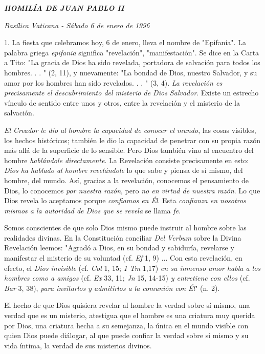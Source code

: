 \begin{body}
\emph{\textbf{HOMILÍA DE JUAN PABLO II}}

\emph{Basílica Vaticana - Sábado 6 de enero de 1996}

1. La fiesta que celebramos hoy, 6 de enero, lleva el nombre de "Epifanía". La palabra griega \emph{epifania} significa "revelación", "manifestación". Se dice en la Carta a Tito: "La gracia de Dios ha sido revelada, portadora de salvación para todos los hombres. . . " (2, 11), y nuevamente: "La bondad de Dios, nuestro Salvador, y su amor por los hombres han sido revelados. . . " (3, 4). \emph{La revelación es precisamente el descubrimiento del misterio de Dios Salvador}. Existe un estrecho vínculo de sentido entre unos y otros, entre la revelación y el misterio de la salvación.

\emph{El Creador le dio al hombre la capacidad de conocer el mundo}, las cosas visibles, los hechos históricos; también le dio la capacidad de penetrar con su propia razón más allá de la superficie de lo sensible. Pero Dios también vino al encuentro del hombre \emph{hablándole directamente}. La Revelación consiste precisamente en esto: \emph{Dios ha hablado al hombre revelándole} lo que sabe y piensa de sí mismo, del hombre, del mundo. Así, gracias a la revelación, conocemos el pensamiento de Dios, lo conocemos \emph{por nuestra razón}, pero \emph{no en virtud de nuestra razón}. Lo que Dios revela lo aceptamos porque \emph{confiamos en Él}. Esta \emph{confianza en nosotros mismos a la autoridad de Dios que se revela} se llama \emph{fe}.

Somos conscientes de que solo Dios mismo puede instruir al hombre sobre las realidades divinas. En la Constitución conciliar \emph{Del Verbum} sobre la Divina Revelación leemos: "Agradó a Dios, en su bondad y sabiduría, revelarse y manifestar el misterio de su voluntad (cf. \emph{Ef} 1, 9) ... Con esta revelación, en efecto, el \emph{Dios invisible} (cf. \emph{Col} 1, 15; \emph{1 Tm} 1,17) \emph{en su inmenso amor habla a los hombres como a amigos} (cf. \emph{Ex} 33, 11; \emph{Jn} 15, 14-15) \emph{y entretiene con ellos} (cf. \emph{Bar} 3, 38), \emph{para invitarlos y admitirlos a la comunión con Él}" (n. 2).

El hecho de que Dios quisiera revelar al hombre la verdad sobre sí mismo, una verdad que es un misterio, atestigua que el hombre es una criatura muy querida por Dios, una criatura hecha a su semejanza, la única en el mundo visible con quien Dios puede diálogar, al que puede confiar la verdad sobre sí mismo y su vida íntima, la verdad de sus misterios divinos.


\end{body}
